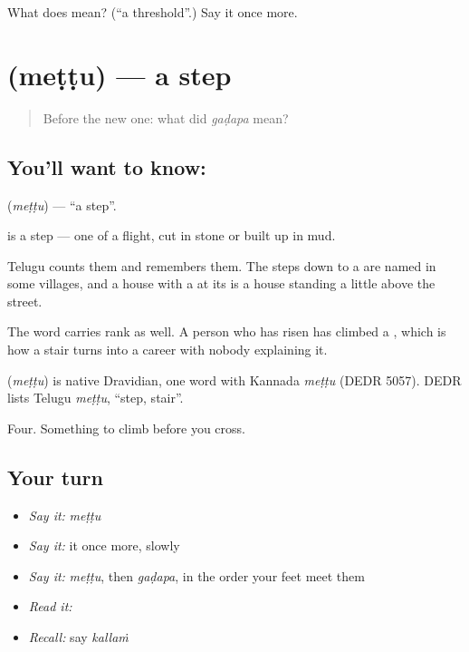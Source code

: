 \begin{tcolorbox}[breakable,colback=teal!4,colframe=teal!35!black,title={Before you move on}]
What does  mean? (\textquotedblleft{}a threshold\textquotedblright{}.) Say it once more.
\end{tcolorbox}
\section[\texorpdfstring{\te{మెట్టు} (meṭṭu)}{మెట్టు (meṭṭu)}]{ (meṭṭu) — a step}

\label{lesson:TE-C67-step}



\begin{quote}
Before the new one: what did \emph{gaḍapa} mean?
\end{quote}

\subsection*{You'll want to know: }
\textbf{} (\emph{meṭṭu}) — \textquotedblleft{}a step\textquotedblright{}.

 is a step — one of a flight, cut in stone or built up in mud.

Telugu counts them and remembers them. The steps down to a  are named in some villages, and a house with a  at its  is a house standing a little above the street.

The word carries rank as well. A person who has risen has climbed a , which is how a stair turns into a career with nobody explaining it.

\begin{cousinweb}
\textbf{} (\emph{meṭṭu}) is native Dravidian, one word with Kannada \emph{meṭṭu} (DEDR 5057). DEDR lists Telugu \emph{meṭṭu}, \textquotedblleft{}step, stair\textquotedblright{}.
\end{cousinweb}

\begin{grammarlens}[title={What you've built}]
Four. Something to climb before you cross.
\end{grammarlens}

\subsection*{Your turn}
\begin{itemize}
\raggedright
  \item \emph{Say it:} \emph{meṭṭu}
  \item \emph{Say it:} it once more, slowly
  \item \emph{Say it:} \emph{meṭṭu}, then \emph{gaḍapa}, in the order your feet meet them
  \item \emph{Read it:} \textbf{}
  \item \emph{Recall:} say \emph{kallaṁ}
\end{itemize}

